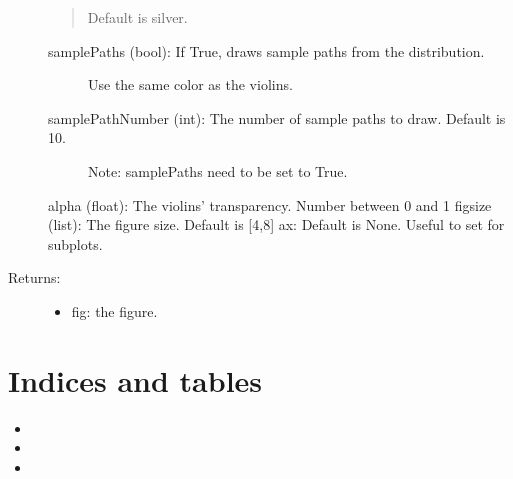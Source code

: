 \documentclass[letterpaper,10pt,english]{sphinxmanual}
\begin{document}
\begin{fulllineitems}
\begin{description}
\begin{quote}
Default is silver.
\end{quote}
\begin{description}
\item[{samplePaths (bool): If True, draws sample paths from the distribution.}] \leavevmode
Use the same color as the violins.

\item[{samplePathNumber (int): The number of sample paths to draw. Default is 10.}] \leavevmode
Note: samplePaths need to be set to True.

\end{description}

alpha (float): The violins’ transparency. Number between 0 and 1
figsize (list): The figure size. Default is {[}4,8{]}
ax: Default is None. Useful to set for subplots.

\item[{Returns:}] \leavevmode\begin{itemize}
\item {} 
fig: the figure.

\end{itemize}

\end{description}

\end{fulllineitems}



\chapter{Indices and tables}
\label{\detokenize{index:indices-and-tables}}\begin{itemize}
\item {} 

\item {} 

\item {} 

\end{itemize}



\renewcommand{\indexname}{Index}
\printindex
\end{document}
